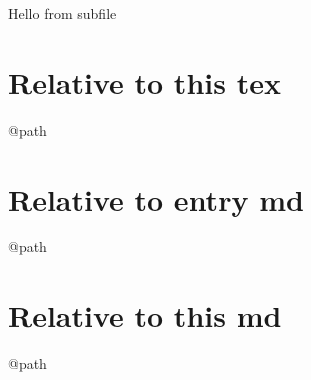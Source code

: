 Hello from subfile


\section{Relative to this tex}
\makeatletter
@path
\makeatother


\section{Relative to entry md}
\makeatletter
@path
\makeatother


\section{Relative to this md}
\makeatletter
@path
\makeatother
